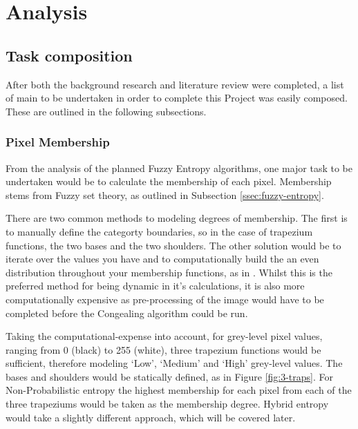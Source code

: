 \section{Analysis}

\subsection{Task composition}

After both the background research and literature review were completed, a list of main  to be undertaken in order to complete this Project was easily composed. These are outlined in the following subsections.

\subsubsection{Pixel Membership}

From the analysis of the planned Fuzzy Entropy algorithms, one major task to be undertaken would be to calculate the membership of each pixel. Membership stems from Fuzzy set theory, as outlined in Subsection \ref{ssec:fuzzy-entropy}.

There are two common methods to modeling degrees of membership. The first is to manually define the categorty boundaries, so in the case of trapezium functions, the two bases and the two shoulders. The other solution would be to iterate over the values you have and to computationally build the an even distribution throughout your membership functions, as in \cite{Mac_Parthalain_Strange_2013}. Whilst this is the preferred method for being dynamic in it's calculations, it is also more computationally expensive as pre-processing of the image would have to be completed before the Congealing algorithm could be run.

Taking the computational-expense into account, for grey-level pixel values, ranging from 0 (black) to 255 (white), three trapezium functions would be sufficient, therefore modeling `Low', `Medium' and `High' grey-level values. The bases and shoulders would be statically defined, as in Figure \ref{fig:3-traps}. For Non-Probabilistic entropy the highest membership for each pixel from each of the three trapeziums would be taken as the membership degree. Hybrid entropy would take a slightly different approach, which will be covered later.

